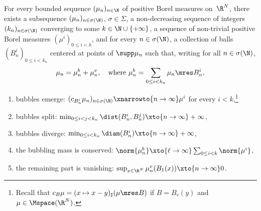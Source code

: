 \begin{theorem}\label{profileDecomposition}
For every bounded sequence \((\mu_n)_{n\in\N}\) of positive Borel measures on~\(\R^N\), there exists a subsequence \((\mu_n)_{n \in \sigma(\N)}\), $\sigma \in \Sigma$, a non-decreasing sequence of integers $(k_n)_{n \in \sigma(\N)}$ converging to some $k \in \N \cup \{+\infty\}$, a sequence of non-trivial positive Borel measures $(\mu^i)_{0\le i<k}$, and for every $n \in \sigma(\N)$, a collection of balls $(B^i_n)_{0 \leq i < k_n}$ centered at points of $\supp \mu_n$ such that, writing for all $n\in \sigma(\N)$,
\begin{equation}
\mu_n = \mu^b_n + \mu^v_n,\quad \text{where } \mu^b_n = \sum_{0\le i < k_n} \mu_n \mres B_n^i,
\end{equation}
\vspace*{-5pt}
\begin{enumerate}[\textnormal(\textup{\Alph*}\textnormal),leftmargin=1.3\normalparindent]
\item\label{bubbleEmergence} bubbles emerge: $(c_{B_{n}^i} \mu_{n})_{n\in\sigma(\N)}\xnarrowto{n\to\infty}\mu^i$ for every $i<k$,\footnote{Recall that $c_B \mu = (x\mapsto x-y)_\sharp(\mu \mres B)$ if $B = B_r(y)$ and $\mu \in \Mspace(\R^N)$.}
\item\label{bubbleSplitting} bubbles split: $\min_{0\le i<j< k_{n}}\dist(B_{n}^i,B_{n}^j) \xto{n\to\infty} +\infty$,
\item\label{bubbleDivergence} bubbles diverge: $ \min_{0\le i< k_n}\diam(B_{n}^i) \xto{n\to\infty} +\infty$,
\item\label{bubblingMassConservation} the bubbling mass is conserved: $\norm{\mu^b_{n}} \xto{\ell \to \infty} \sum_{0\le i<k} \norm{\mu^i}$,
\item\label{remainingVanishing} the remaining part is vanishing: $\sup_{x\in \R^N} \mu^v_{n}(B_1(x)) \xto{n\to\infty} 0$.
\end{enumerate}
\end{theorem}
